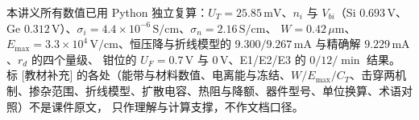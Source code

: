 \documentclass[11pt]{ctexart}
\begin{document}
\flowerrule

{\small\color{inkgray}
本讲义所有数值已用 Python 独立复算：$U_T=25.85\,\mathrm{mV}$、$n_i$ 与 $V_{bi}$（Si $0.693\,\mathrm{V}$、
Ge $0.312\,\mathrm{V}$）、$\sigma_i=4.4\times10^{-6}\,\mathrm{S/cm}$、$\sigma_n=2.16\,\mathrm{S/cm}$、
$W=0.42\,\mu\mathrm{m}$、$E_{\max}=3.3\times10^{4}\,\mathrm{V/cm}$、恒压降与折线模型的
$9.300/9.267\,\mathrm{mA}$ 与精确解 $9.229\,\mathrm{mA}$、$r_d$ 的四个量级、
钳位的 $U_F=0.7\,\mathrm{V}$ 与 $0\,\mathrm{V}$、E1/E2/E3 的 $0/12/\min$ 结果。
标 [教材补充] 的各处（能带与材料数值、电离能与冻结、$W/E_{\max}/C_T$、击穿两机制、掺杂范围、折线模型、扩散电容、热阻与降额、器件型号、单位换算、术语对照）不是课件原文，
只作理解与计算支撑，不作文档口径。}
\end{document}
